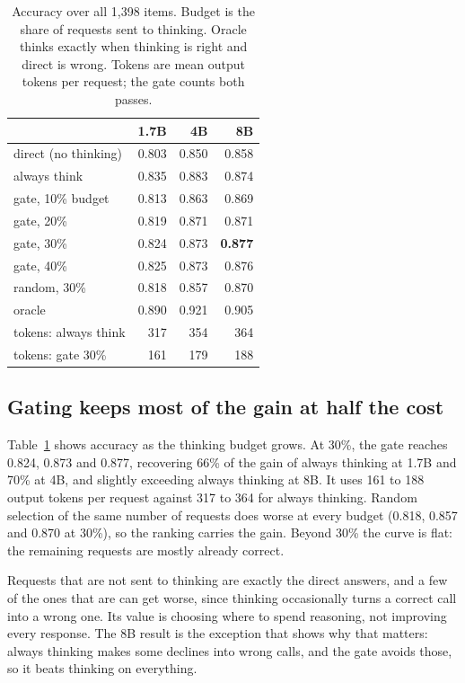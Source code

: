 \documentclass[10pt,twocolumn]{article}
\begin{document}
\begin{table}[t]
\centering\small
\begin{tabular}{lrrr}
\toprule
& 1.7B & 4B & 8B \\
\midrule
direct (no thinking) & 0.803 & 0.850 & 0.858 \\
always think & 0.835 & 0.883 & 0.874 \\
\midrule
gate, 10\% budget & 0.813 & 0.863 & 0.869 \\
gate, 20\% & 0.819 & 0.871 & 0.871 \\
gate, 30\% & 0.824 & 0.873 & \textbf{0.877} \\
gate, 40\% & 0.825 & 0.873 & 0.876 \\
random, 30\% & 0.818 & 0.857 & 0.870 \\
oracle & 0.890 & 0.921 & 0.905 \\
\midrule
tokens: always think & 317 & 354 & 364 \\
tokens: gate 30\% & 161 & 179 & 188 \\
\bottomrule
\end{tabular}
\caption{Accuracy over all 1,398 items. Budget is the share of requests sent to thinking. Oracle thinks exactly
when thinking is right and direct is wrong. Tokens are mean output tokens per request; the gate counts both passes.}
\label{tab:gate}
\end{table}

\subsection{Gating keeps most of the gain at half the cost}

Table~\ref{tab:gate} shows accuracy as the thinking budget grows. At 30\%, the gate reaches 0.824, 0.873 and 0.877,
recovering 66\% of the gain of always thinking at 1.7B and 70\% at 4B, and slightly exceeding always thinking at 8B.
It uses 161 to 188 output tokens per request against 317 to 364 for always thinking. Random selection of the same
number of requests does worse at every budget (0.818, 0.857 and 0.870 at 30\%), so the ranking carries the gain.
Beyond 30\% the curve is flat: the remaining requests are mostly already correct.

Requests that are not sent to thinking are exactly the direct answers, and a few of the ones that are can get worse,
since thinking occasionally turns a correct call into a wrong one. Its value is
choosing where to spend reasoning, not improving every response. The 8B result is the exception that shows why that
matters: always thinking makes some declines into wrong calls, and the gate avoids those, so it beats thinking on
everything.
\end{document}
